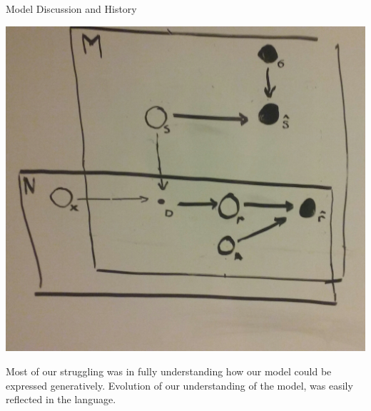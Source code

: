 \documentclass[11pt]{beamer}
\begin{document}
\begin{frame}{Model Discussion and History}
\begin{multicols}{3}
\includegraphics[width=0.3\textheight]{pictures/3plate.jpg}
\vfill\columnbreak

Most of our struggling was in fully understanding how our model could be expressed generatively. 
\newline\newline
Evolution of our understanding of the model, was easily reflected in the language. 
\end{multicols}

\end{frame}
\end{document}
